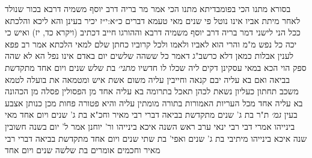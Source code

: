 \documentclass[12pt, openany]{book}
\begin{document}
{בסורא מתנו הכי בפומבדיתא מתנו הכי  אמר מר בריה דרב יוסף משמיה דרבא בכור שנולד לאחר מיתת אביו אינו נוטל פי שנים מאי טעמא {דברים כ״א:י״ז } יכיר בעינן והא ליכא
והלכתא ככל הני לישני דמר בריה דרב יוסף משמיה דרבא
וההורגו חייב דכתיב  (ויקרא כד, יז) ואיש כי יכה כל נפש מ"מ
והרי הוא לאביו ולאמו ולכל קרוביו כחתן שלם למאי הלכתא  אמר רב פפא  לענין אבלות 
כמאן  דלא כרשב"ג דאמר כל ששהה שלשים יום באדם אינו נפל הא לא שהה ספק הוי  הכא במאי עסקינן דקים ליה שכלו לו חדשיו
{\large\emph{מתני׳}} בת שלש שנים ויום אחד מתקדשת בביאה ואם בא עליה יבם קנאה וחייבין עליה משום אשת איש
ומטמאה את בועלה לטמא משכב תחתון כעליון 
נשאת לכהן תאכל בתרומה  בא עליה אחד מן הפסולין פסלה מן הכהונה  בא עליה אחד מכל העריות האמורות בתורה מומתין עליה והיא פטורה 
פחות מכן כנותן אצבע בעין
{\large\emph{גמ׳}} ת"ר בת ג' שנים מתקדשת בביאה דברי רבי מאיר  וחכ"א  בת ג' שנים ויום אחד  מאי בינייהו  אמרי דבי רבי ינאי  ערב ראש השנה איכא בינייהו 
ור' יוחנן אמר  ל' יום בשנה חשובין שנה איכא בינייהו 
מיתיבי בת ג' שנים ואפי' בת שתי שנים ויום אחד מתקדשת בביאה דברי רבי מאיר  וחכמים אומרים  בת שלשה שנים ויום אחד}
\end{document}
